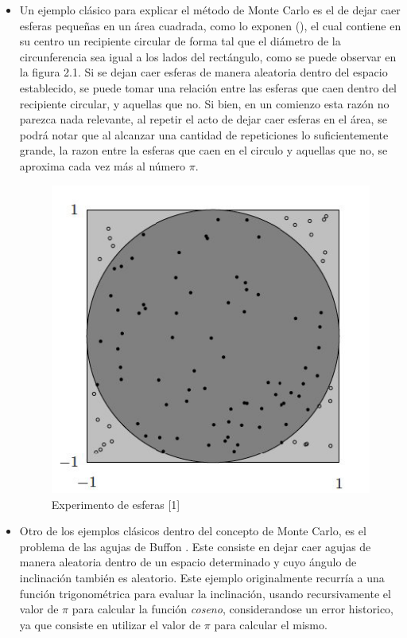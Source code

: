 \begin{itemize}
\item Un ejemplo clásico para explicar el método de Monte Carlo es el de dejar caer esferas pequeñas en un área cuadrada, como lo exponen \citeauthor{johansen2007} (\citeyear{johansen2007}), el cual contiene en su centro un recipiente circular de forma tal que el diámetro de la circunferencia sea igual a los lados del rectángulo, como se puede observar en la figura 2.1. Si se dejan caer esferas de manera aleatoria dentro del espacio establecido, se puede tomar una relación entre las esferas que caen dentro del recipiente circular, y aquellas que no. Si bien, en un comienzo esta razón no parezca nada relevante, al repetir el acto de dejar caer esferas en el área, se podrá notar que al alcanzar una cantidad de repeticiones lo suficientemente grande, la razon entre la esferas que caen en el circulo y aquellas que no, se aproxima cada vez más al número $\pi$.
    
    \begin{center}
        \begin{figure}[H]
            \begin{center}
                \includegraphics[scale=0.69]{images/montesferas.PNG} %
                \caption{Experimento de esferas [1]}
                \label{fig:my_label}
            \end{center}
        \end{figure}
    \end{center}
    
    \item Otro de los ejemplos clásicos dentro del concepto de Monte Carlo, es el problema de las agujas de Buffon \citep{vargas2020}. Este consiste en dejar caer agujas de manera aleatoria dentro de un espacio determinado y cuyo ángulo de inclinación también es aleatorio. Este ejemplo originalmente recurría a una función trigonométrica para evaluar la inclinación, usando recursivamente el valor de $\pi$ para calcular la función \textit{coseno}, considerandose un error historico, ya que consiste en utilizar el valor de $\pi$ para calcular el mismo.
    

\end{itemize}
